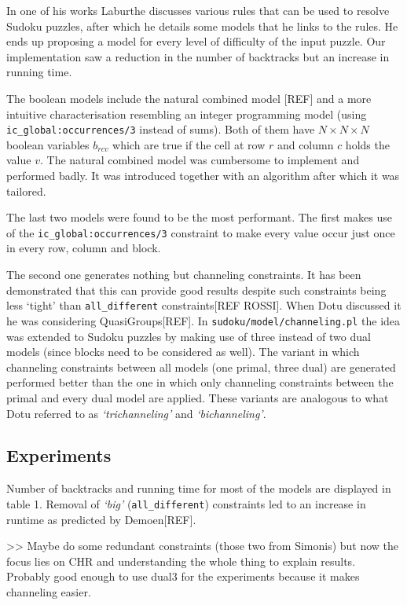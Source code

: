 In one of his works Laburthe discusses various rules that can be used to resolve Sudoku puzzles, after which he details some models that he links to the rules. He ends up proposing a model for every level of difficulty of the input puzzle. Our implementation saw a reduction in the number of backtracks but an increase in running time. \\\par

The boolean models include the natural combined model [REF] and a more intuitive characterisation resembling an integer programming model (using \texttt{ic\_global:occurrences/3} instead of sums). Both of them have $N\times N\times N$ boolean variables $b_{rcv}$ which are true if the cell at row $r$ and column $c$ holds the value $v$. The natural combined model was cumbersome to implement and performed badly. It was introduced together with an algorithm after which it was tailored.\\\par

The last two models were found to be the most performant. The first makes use of the \texttt{ic\_global:occurrences/3} constraint to make every value occur just once in every row, column and block. 
\par The second one generates nothing but channeling constraints. It has been demonstrated that this can provide good results despite such constraints being less `tight' than \texttt{all\_different} constraints[REF ROSSI]. When Dotu discussed it he was considering QuasiGroups[REF]. In \texttt{sudoku/model/channeling.pl} the idea was extended to Sudoku puzzles by making use of three instead of two dual models (since blocks need to be considered as well). The variant in which channeling constraints between all models (one primal, three dual) are generated performed better than the one in which only channeling constraints between the primal and every dual model are applied. These variants are analogous to what Dotu referred to as \textit{`trichanneling'} and \textit{`bichanneling'}. \\\par

\subsection{Experiments}

Number of backtracks and running time for most of the models are displayed in table 1. Removal of \textit{`big'} (\texttt{all\_different}) constraints led to an increase in runtime as predicted by Demoen[REF]. \\\par

>> Maybe do some redundant constraints (those two from Simonis) but now the focus lies on CHR and understanding the whole thing to explain results. Probably good enough to use dual3 for the experiments because it makes channeling easier.